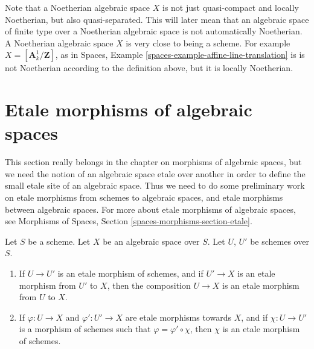 \noindent
Note that a Noetherian algebraic space $X$ is not just quasi-compact
and locally Noetherian, but also quasi-separated. This will later mean
that an algebraic space of finite type over a Noetherian algebraic space
is not automatically Noetherian.
A Noetherian algebraic space $X$ is very close to being a scheme.
For example $X = [\mathbf{A}^1_k/\mathbf{Z}]$,
as in Spaces, Example \ref{spaces-example-affine-line-translation} is
is not Noetherian according to the definition above, but it is locally
Noetherian.




\section{Etale morphisms of algebraic spaces}
\label{section-etale-morphisms}

\noindent
This section really belongs in the chapter on morphisms of algebraic
spaces, but we need the notion of an algebraic space etale over another
in order to define the small etale site of an algebraic space.
Thus we need to do some preliminary work on etale morphisms from schemes to
algebraic spaces, and etale morphisms between algebraic spaces.
For more about etale morphisms of algebraic spaces, see
Morphisms of Spaces, Section \ref{spaces-morphisms-section-etale}.

\begin{lemma}
\label{lemma-etale-over-space}
Let $S$ be a scheme.
Let $X$ be an algebraic space over $S$.
Let $U$, $U'$ be schemes over $S$.
\begin{enumerate}
\item If $U \to U'$ is an etale morphism of schemes, and
if $U' \to X$ is an etale morphism from $U'$ to $X$, then the
composition $U \to X$ is an etale morphism from $U$ to $X$.
\item If $\varphi : U \to X$ and $\varphi' : U' \to X$ are
etale morphisms towards $X$, and if $\chi : U \to U'$ is a
morphism of schemes such that $\varphi = \varphi' \circ \chi$,
then $\chi$ is an etale morphism of schemes.
\end{enumerate}
\end{lemma}

